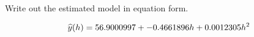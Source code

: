 Write out the estimated model in equation form.

\soln*
$$\widehat{y}(h) = 56.9000997 + -0.4661896 h + 0.0012305 h^2$$